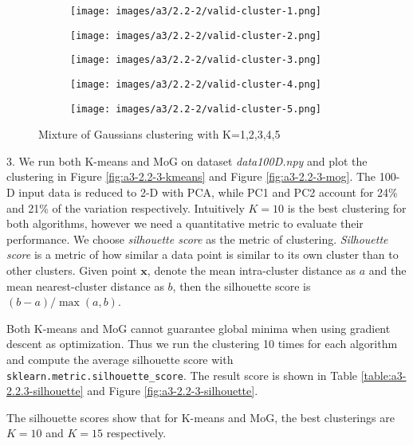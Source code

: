 \documentclass[12pt]{article}
\begin{document}
\begin{figure}[!htb]
\centering
\begin{subfigure}{.33\linewidth}
  \centering
  \texttt{[image: images/a3/2.2-2/valid-cluster-1.png]}
\end{subfigure}%
\begin{subfigure}{.33\linewidth}
  \centering
  \texttt{[image: images/a3/2.2-2/valid-cluster-2.png]}
\end{subfigure}
\begin{subfigure}{.33\linewidth}
  \centering
  \texttt{[image: images/a3/2.2-2/valid-cluster-3.png]}
\end{subfigure}
\begin{subfigure}{.33\linewidth}
  \centering
  \texttt{[image: images/a3/2.2-2/valid-cluster-4.png]}
\end{subfigure}
\begin{subfigure}{.33\linewidth}
  \centering
  \texttt{[image: images/a3/2.2-2/valid-cluster-5.png]}
\end{subfigure}
\caption{Mixture of Gaussians clustering with K=1,2,3,4,5}
\label{fig:a3-2.2-2}
\end{figure}

\bigskip

3. We run both K-means and MoG on dataset \emph{data100D.npy} and plot the clustering in Figure \ref{fig:a3-2.2-3-kmeans} and Figure \ref{fig:a3-2.2-3-mog}.
The 100-D input data is reduced to 2-D with PCA, while PC1 and PC2 account for 24\% and 21\% of the variation respectively. Intuitively $K=10$ is the best clustering for both algorithms, however we need a quantitative metric to evaluate their performance. 
We choose \emph{silhouette score} as the metric of clustering. \emph{Silhouette score} is a metric of how similar a data point is similar to its own cluster than to other clusters. Given point $\mathbf{x}$, denote the mean intra-cluster distance as $a$ and the mean nearest-cluster distance as $b$, then the silhouette score is $(b - a) / \max(a, b)$. 

Both K-means and MoG cannot guarantee global minima when using gradient descent as optimization. Thus we run the clustering 10 times for each algorithm and compute the average silhouette score with \texttt{sklearn.metric.silhouette\_score}. The result score is shown in Table \ref{table:a3-2.2.3-silhouette} and Figure \ref{fig:a3-2.2-3-silhouette}.

The silhouette scores show that for K-means and MoG, the best clusterings are $K=10$ and $K=15$ respectively.
\end{document}
